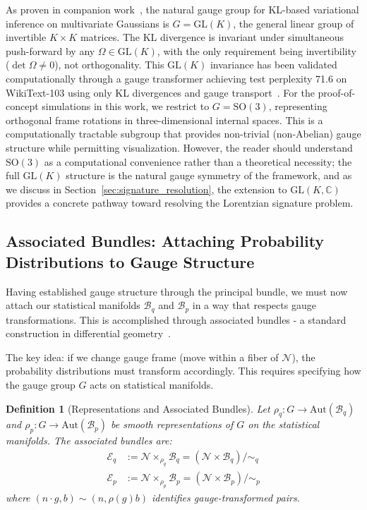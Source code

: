 \documentclass[11pt]{article}
\newtheorem{definition}{Definition}
\begin{document}
As proven in companion work~\cite{Dennis2026GL}, the natural gauge group for KL-based variational inference on multivariate Gaussians is $G = \mathrm{GL}(K)$, the general linear group of invertible $K \times K$ matrices. The KL divergence is invariant under simultaneous push-forward by any $\Omega \in \mathrm{GL}(K)$, with the only requirement being invertibility ($\det \Omega \neq 0$), not orthogonality. This $\mathrm{GL}(K)$ invariance has been validated computationally through a gauge transformer achieving test perplexity 71.6 on WikiText-103 using only KL divergences and gauge transport~\cite{Dennis2026GL}. For the proof-of-concept simulations in this work, we restrict to $G = \mathrm{SO}(3)$, representing orthogonal frame rotations in three-dimensional internal spaces. This is a computationally tractable subgroup that provides non-trivial (non-Abelian) gauge structure while permitting visualization. However, the reader should understand $\mathrm{SO}(3)$ as a computational convenience rather than a theoretical necessity; the full $\mathrm{GL}(K)$ structure is the natural gauge symmetry of the framework, and as we discuss in Section~\ref{sec:signature_resolution}, the extension to $\mathrm{GL}(K, \mathbb{C})$ provides a concrete pathway toward resolving the Lorentzian signature problem.

\subsection{Associated Bundles: Attaching Probability Distributions to Gauge Structure}

Having established gauge structure through the principal bundle, we must now attach our statistical manifolds $\mathcal{B}_q$ and $\mathcal{B}_p$ in a way that respects gauge transformations. This is accomplished through associated bundles - a standard construction in differential geometry~\cite{Nakahara2003,Frankel2011}.

The key idea: if we change gauge frame (move within a fiber of $\mathcal{N}$), the probability distributions must transform accordingly. This requires specifying how the gauge group $G$ acts on statistical manifolds.

\begin{definition}[Representations and Associated Bundles]
Let $\rho_q: G \to \mathrm{Aut}(\mathcal{B}_q)$ and $\rho_p: G \to \mathrm{Aut}(\mathcal{B}_p)$ be smooth representations of $G$ on the statistical manifolds. The associated bundles are:
\begin{align}
\mathcal{E}_q &:= \mathcal{N} \times_{\rho_q} \mathcal{B}_q = \left(\mathcal{N} \times \mathcal{B}_q\right)/{\sim_q} \\
\mathcal{E}_p &:= \mathcal{N} \times_{\rho_p} \mathcal{B}_p = \left(\mathcal{N} \times \mathcal{B}_p\right)/{\sim_p}
\end{align}
where $(n \cdot g, b) \sim (n, \rho(g)b)$ identifies gauge-transformed pairs.
\end{definition}
\end{document}
